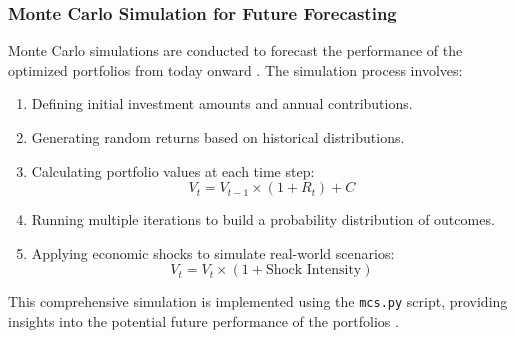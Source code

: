\subsubsection{Monte Carlo Simulation for Future Forecasting}
Monte Carlo simulations are conducted to forecast the performance of the optimized portfolios from today onward \citep{glasserman2004monte}. The simulation process involves:
\begin{enumerate}
    \item Defining initial investment amounts and annual contributions.
    \item Generating random returns based on historical distributions.
    \item Calculating portfolio values at each time step:
    \begin{equation}
        V_t = V_{t-1} \times (1 + R_t) + C
    \end{equation}
    \item Running multiple iterations to build a probability distribution of outcomes.
    \item Applying economic shocks to simulate real-world scenarios:
    \begin{equation}
        V_t = V_t \times (1 + \text{Shock Intensity})
    \end{equation}
\end{enumerate}
This comprehensive simulation is implemented using the \texttt{mcs.py} script, providing insights into the potential future performance of the portfolios \citep{brown2000real, kuhle2021economic}.

\newpage

